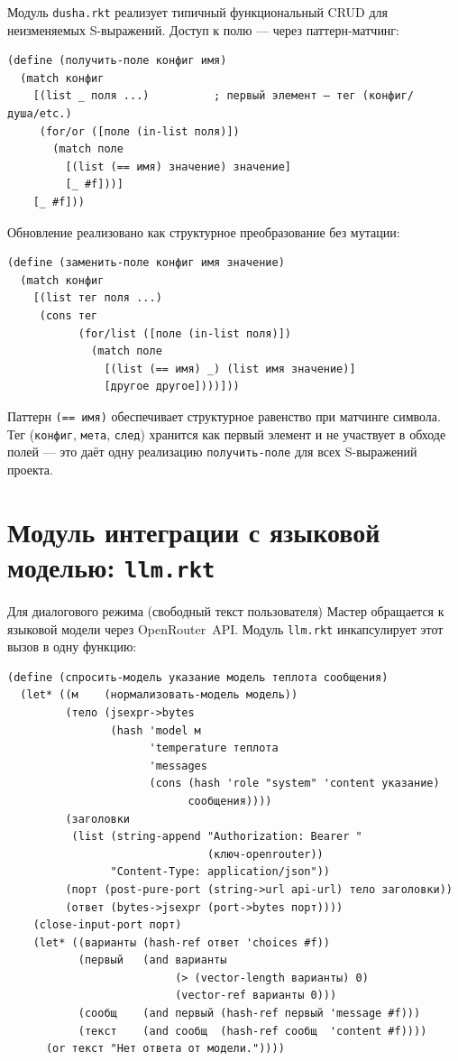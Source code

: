 \documentclass[11pt,a4paper]{article}
\begin{document}
Модуль \texttt{dusha.rkt} реализует типичный функциональный CRUD для
неизменяемых S-выражений. Доступ к полю — через паттерн-матчинг:

\begin{lstlisting}[language=Racket, caption={Чтение поля из S-выражения (dusha.rkt)}]
(define (получить-поле конфиг имя)
  (match конфиг
    [(list _ поля ...)          ; первый элемент — тег (конфиг/душа/etc.)
     (for/or ([поле (in-list поля)])
       (match поле
         [(list (== имя) значение) значение]
         [_ #f]))]
    [_ #f]))
\end{lstlisting}

Обновление реализовано как структурное преобразование без мутации:

\begin{lstlisting}[language=Racket, caption={Функциональное обновление поля конфига}]
(define (заменить-поле конфиг имя значение)
  (match конфиг
    [(list тег поля ...)
     (cons тег
           (for/list ([поле (in-list поля)])
             (match поле
               [(list (== имя) _) (list имя значение)]
               [другое другое])))]))
\end{lstlisting}

Паттерн \texttt{(== имя)} обеспечивает структурное равенство при матчинге символа.
Тег (\texttt{конфиг}, \texttt{мета}, \texttt{след}) хранится как первый элемент
и не участвует в обходе полей — это даёт одну реализацию \texttt{получить-поле}
для всех S-выражений проекта.

\section{Модуль интеграции с языковой моделью: \texttt{llm.rkt}}

Для диалогового режима (свободный текст пользователя) Мастер обращается к
языковой модели через OpenRouter~API. Модуль \texttt{llm.rkt} инкапсулирует
этот вызов в одну функцию:

\begin{lstlisting}[language=Racket, caption={Ядро интеграции с LLM (llm.rkt)}]
(define (спросить-модель указание модель теплота сообщения)
  (let* ((м    (нормализовать-модель модель))
         (тело (jsexpr->bytes
                (hash 'model м
                      'temperature теплота
                      'messages
                      (cons (hash 'role "system" 'content указание)
                            сообщения))))
         (заголовки
          (list (string-append "Authorization: Bearer "
                               (ключ-openrouter))
                "Content-Type: application/json"))
         (порт (post-pure-port (string->url api-url) тело заголовки))
         (ответ (bytes->jsexpr (port->bytes порт))))
    (close-input-port порт)
    (let* ((варианты (hash-ref ответ 'choices #f))
           (первый   (and варианты
                          (> (vector-length варианты) 0)
                          (vector-ref варианты 0)))
           (сообщ    (and первый (hash-ref первый 'message #f)))
           (текст    (and сообщ  (hash-ref сообщ  'content #f))))
      (or текст "Нет ответа от модели."))))
\end{lstlisting}
\end{document}
